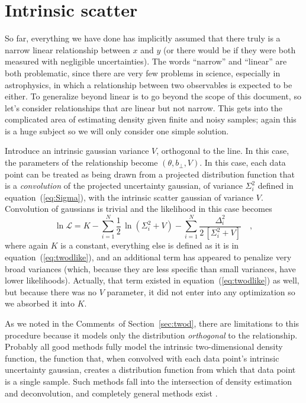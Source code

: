 \documentclass[12pt,twoside]{article}
\newcommand{\documentname}{document}
\newcommand{\sectionname}{Section}
\newcommand{\equationname}{equation}
\newcommand{\commentsname}{Comments}
\newcounter{problem}
\newcommand{\like}{\mathscr{L}}
\newcommand{\bperp}{b_{\perp}}
\begin{document}
\section{Intrinsic scatter}\label{sec:scatter}

So far, everything we have done has implicitly assumed that there
truly is a narrow linear relationship between $x$ and $y$ (or there
would be if they were both measured with negligible uncertainties).
The words ``narrow'' and ``linear'' are both problematic, since there
are very few problems in science, especially in astrophysics, in which
a relationship between two observables is expected to be either.  To
generalize beyond linear is to go beyond the scope of this
\documentname, so let's consider relationships that are linear but not
narrow.  This gets into the complicated area of estimating density
given finite and noisy samples; again this is a huge subject so we
will only consider one simple solution.

Introduce an intrinsic gaussian variance $V$, orthogonal to the line.
In this case, the parameters of the relationship become
$(\theta,\bperp,V)$.  In this case, each data point can be treated as
being drawn from a projected distribution function that is a
\emph{convolution} of the projected uncertainty gaussian, of variance
$\Sigma_i^2$ defined in \equationname~(\ref{eq:Sigma}), with the
intrinsic scatter gaussian of variance $V$.  Convolution of gaussians
is trivial and the likelihood in this case becomes
\begin{equation}
\ln\like = K - \sum_{i=1}^N \frac{1}{2}\,\ln(\Sigma_{i}^2+V)
 - \sum_{i=1}^N \frac{\Delta_i^2}{2\,[\Sigma_{i}^2+V]} \quad ,
\end{equation}
where again $K$ is a constant, everything else is defined as it is in
\equationname~(\ref{eq:twodlike}), and an additional term has
appeared to penalize very broad variances (which, because they are
less specific than small variances, have lower likelihoods).
Actually, that term existed in \equationname~(\ref{eq:twodlike}) as
well, but because there was no $V$ parameter, it did not enter into
any optimization so we absorbed it into $K$.

As we noted in the \commentsname\ of \sectionname~\ref{sec:twod},
there are limitations to this procedure because it models only the
distribution \emph{orthogonal} to the relationship.  Probably all good
methods fully model the intrinsic two-dimensional density function,
the function that, when convolved with each data point's intrinsic
uncertainty gaussian, creates a distribution function from which that
data point is a single sample.  Such methods fall into the
intersection of density estimation and deconvolution, and completely
general methods exist \citep{bovy}.
\end{document}
